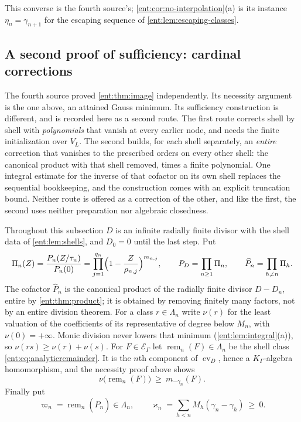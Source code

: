 \documentclass[11pt]{article}
\theoremstyle{plain}
\theoremstyle{plain}
\theoremstyle{plain}
\theoremstyle{definition}
\theoremstyle{definition}
\theoremstyle{definition}
\theoremstyle{definition}
\theoremstyle{remark}
\newcommand{\K}{K_\Gamma}\newcommand{\KD}{K_\Delta}
\newcommand{\E}{\mathcal E_\Gamma}
\DeclareMathOperator{\remp}{rem}\DeclareMathOperator{\Res}{Res}
\DeclareMathOperator{\ev}{ev}
\begin{document}
This converse is the fourth source's; \cref{ent:cor:no-interpolation}(a) is
its instance $\eta_n=\gamma_{n+1}$ for the escaping sequence of
\cref{ent:lem:escaping-classes}.

\subsection{A second proof of sufficiency: cardinal corrections}
\label{ent:sm:subsec:cardinal}
The fourth source proved \cref{ent:thm:image} independently. Its necessity
argument is the one above, an attained Gauss minimum. Its sufficiency
construction is different, and is recorded here as a second route. The
first route corrects shell by shell with \emph{polynomials} that vanish at
every earlier node, and needs the finite initialization over $V_L$. The
second builds, for each shell separately, an \emph{entire} correction that
vanishes to the prescribed orders on every other shell: the canonical product
with that shell removed, times a finite polynomial. One integral estimate for
the inverse of that cofactor on its own shell replaces the sequential
bookkeeping, and the construction comes with an explicit truncation bound.
Neither route is offered as a correction of the other, and like the first,
the second uses neither preparation nor algebraic closedness.

Throughout this subsection $D$ is an infinite radially finite divisor with
the shell data of \cref{ent:lem:shells}, and $D_0=0$ until the last step. Put
\begin{equation}\label{ent:sm:eq:cofactor}
 \Pi_n(Z)=\frac{P_n(Z/\tau_n)}{P_n(0)}
 =\prod_{j=1}^{q_n}\Bigl(1-\frac Z{\rho_{n,j}}\Bigr)^{m_{n,j}},
 \qquad
 P_D=\prod_{n\ge1}\Pi_n,
 \qquad
 \widehat P_n=\prod_{h\ne n}\Pi_h .
\end{equation}
The cofactor $\widehat P_n$ is the canonical product of the radially finite
divisor $D-D_n$, entire by \cref{ent:thm:product}; it is obtained by
removing finitely many factors, not by an entire division theorem. For a
class $r\in\Lambda_n$ write $\nu(r)$ for the least valuation of the
coefficients of its representative of degree below $M_n$, with
$\nu(0)=+\infty$. Monic division never lowers that minimum
(\cref{ent:lem:integral}(a)), so $\nu(rs)\ge\nu(r)+\nu(s)$. For $F\in\E$ let
$\remp_n(F)\in\Lambda_n$ be the shell class \eqref{ent:eq:analyticremainder}.
It is the $n$th component of $\ev_D$, hence a $\K$-algebra homomorphism, and
the necessity proof above shows
\begin{equation}\label{ent:sm:eq:class-bound}
 \nu\bigl(\remp_n(F)\bigr)\ \ge\ m_{-\gamma_n}(F).
\end{equation}
Finally put
\begin{equation}\label{ent:sm:eq:gain}
 \varpi_n=\remp_n(\widehat P_n)\in\Lambda_n,
 \qquad
 \varkappa_n=\sum_{h<n}M_h(\gamma_n-\gamma_h)\ \ge\ 0 .
\end{equation}
\end{document}
